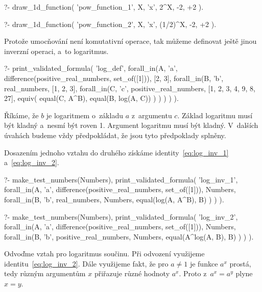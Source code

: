\begin{prolog}
?-	draw_1d_function(
		'pow_function_1',
		X,
		'x',
		2^X,
		-2, +2
	).				
\end{prolog}

\begin{prolog}
?-	draw_1d_function(
		'pow_function_2',
		X,
		'x',
		(1/2)^X,
		-2, +2
	).				
\end{prolog}

Protože umocňování není komutativní operace, tak můžeme definovat ještě jinou inverzní operaci, a~to logaritmus.

\begin{prolog}
?-	print_validated_formula(
		'log_def',
		forall_in(A, 'a', difference(positive_real_numbers, set_of([1])), [2, 3],
			forall_in(B, 'b', real_numbers, [1, 2, 3],
				forall_in(C, 'c', positive_real_numbers, [1, 2, 3, 4, 9, 8, 27],
					equiv(
						equal(C, A^B),
						equal(B, log(A, C))
					)
				)
			)
		)
	).				
\end{prolog}

Říkáme, že \(b\) je logaritmem o~základu \(a\) z~argumentu \(c\). Základ logaritmu musí být kladný a~nesmí být roven 1. Argument logaritmu musí být kladný. V~dalších úvahách budeme vždy předpokládat, že jsou tyto předpoklady splněny.

Dosazením jednoho vztahu do druhého získáme identity~\eqref{eq:log_inv_1} a~\eqref{eq:log_inv_2}.

\begin{fact}
\begin{prolog}
?-	make_test_numbers(Numbers),
	print_validated_formula(
		'log_inv_1',
		forall_in(A, 'a', difference(positive_real_numbers, set_of([1])), Numbers,
			forall_in(B, 'b', real_numbers, Numbers,
				equal(log(A, A^B), B)
			)
		)
	).				
\end{prolog}
\begin{prolog}
?-	make_test_numbers(Numbers),
	print_validated_formula(
		'log_inv_2',
		forall_in(A, 'a', difference(positive_real_numbers, set_of([1])), Numbers,
			forall_in(B, 'b', positive_real_numbers, Numbers,
				equal(A^log(A, B), B)
			)
		)
	).				
\end{prolog}
\end{fact}

Odvoďme vztah pro logaritmus součinu. Při odvození využijeme identitu~\eqref{eq:log_inv_2}. Dále využijeme fakt, že pro \(a \neq 1\) je funkce \(a^x\) prostá, tedy různým argumentům \(x\) přiřazuje různé hodnoty \(a^x\). Proto z~\(a^x = a^y\) plyne \(x = y\).


